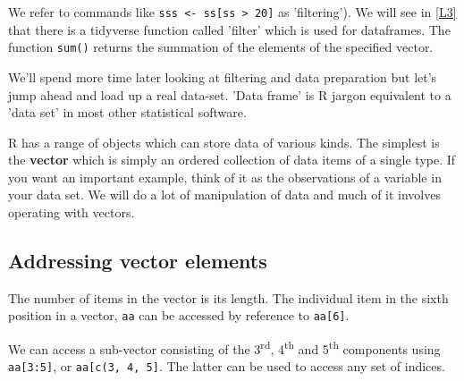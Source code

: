 \documentclass[titlepage]{book}\usepackage{knitr}
\begin{document}
\begin{knitrout}
\color{fgcolor}\begin{kframe}
\begin{alltt}
\hlcom{#----------------------------------------------------------------------------------}
 \hlkwb{<-} \hlopt{:}      
\hlstd{ss[}\hlstd{]}
 \hlkwb{<-} \hlstd{ss[ss} \hlopt{>} \hlstd{]}   
\hlcom{#-----------------------------------------------------------------------------------}
\end{alltt}
\end{kframe}
\end{knitrout}
We refer to commands like  \texttt{sss <- ss[ss > 20]} as 'filtering').  We will see in \ref{L3} that there is a tidyverse function called 'filter' which is used for dataframes.
The function \texttt{sum()} returns the summation of the elements of the specified vector.

We'll spend more time later looking at filtering and data preparation but let's jump ahead and load up a real data-set.  'Data frame' is R jargon  equivalent to a 'data set' in most other statistical software.


R has a range of objects which can store data of various kinds.  The simplest is the \textbf{vector} which is simply an ordered collection of data items of a single type. If you want an important example, think of it as the observations of a variable in your data set. We will do a lot of manipulation of data and much of it involves operating with vectors.

\subsection{Addressing vector elements}\label{vecAddress}

The number of items in the vector is its length. The individual item in the sixth position in a vector, \texttt{aa} can be accessed by reference to \texttt{aa[6]}.

We can access a sub-vector consisting of the 3\textsuperscript{rd}, 4\textsuperscript{th} and 5\textsuperscript{th} components using \texttt{aa[3:5]}, or \texttt{aa[c(3, 4, 5]}. The latter can be used to access any set of indices.
\end{document}
